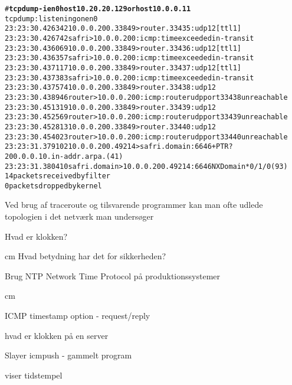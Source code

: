 \documentclass[20pt,landscape,a4paper,footrule]{foils}
\begin{document}

\begin{alltt}
\small # {\bfseries tcpdump -i en0 host 10.20.20.129 or host 10.0.0.11}
tcpdump: listening on en0
23:23:30.426342 10.0.0.200.33849 > router.33435: udp 12 [ttl 1]
23:23:30.426742 safri > 10.0.0.200: icmp: time exceeded in-transit
23:23:30.436069 10.0.0.200.33849 > router.33436: udp 12 [ttl 1]
23:23:30.436357 safri > 10.0.0.200: icmp: time exceeded in-transit
23:23:30.437117 10.0.0.200.33849 > router.33437: udp 12 [ttl 1]
23:23:30.437383 safri > 10.0.0.200: icmp: time exceeded in-transit
23:23:30.437574 10.0.0.200.33849 > router.33438: udp 12
23:23:30.438946 router > 10.0.0.200: icmp: router udp port 33438 unreachable
23:23:30.451319 10.0.0.200.33849 > router.33439: udp 12
23:23:30.452569 router > 10.0.0.200: icmp: router udp port 33439 unreachable
23:23:30.452813 10.0.0.200.33849 > router.33440: udp 12
23:23:30.454023 router > 10.0.0.200: icmp: router udp port 33440 unreachable
23:23:31.379102 10.0.0.200.49214 > safri.domain:  6646+ PTR? \\
200.0.0.10.in-addr.arpa. (41)
23:23:31.380410 safri.domain > 10.0.0.200.49214:  6646 NXDomain* 0/1/0 (93)
14 packets received by filter
0 packets dropped by kernel
\end{alltt}




\begin{list1}
\item Ved brug af traceroute og tilsvarende programmer kan man ofte
  udlede topologien i det netværk man undersøger  
\end{list1}




\begin{center}
\hlkbig Hvad er klokken?

 cm
Hvad betydning har det for sikkerheden?

Brug NTP Network Time Protocol på produktionssystemer
\end{center}


 cm

\begin{list1}
  \item ICMP timestamp option - request/reply
\item hvad er klokken på en server
\item Slayer icmpush - gammelt program
\item viser tidstempel
\end{list1}
\end{document}
